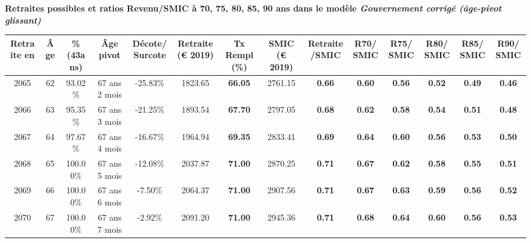  \vspace{0.1cm} 
{\bf \noindent Retraites possibles et ratios Revenu/SMIC à 70, 75, 80, 85, 90 ans dans le modèle \emph{Gouvernement corrigé (âge-pivot glissant)}}  
 
\begin{adjustbox}{max width=\textwidth} 
\begin{tabular}[htb]{|c|c||c|c|c||c|c||c|c||c|c|c|c|c|} 
\hline 
 Retraite en &  Âge &  \%(43ans) &  Âge pivot &  Décote/Surcote &  Retraite (\euro{} 2019) &  Tx Rempl(\%) &  SMIC (\euro{} 2019) &  Retraite/SMIC &  R70/SMIC &  R75/SMIC &  R80/SMIC &  R85/SMIC &  R90/SMIC \\ 
\hline \hline 
 2065 &  62 &  93.02\% &  67 ans 2 mois &  -25.83\% &  1823.65 &  {\bf 66.05} &  2761.15 &  {\bf {\color{red} 0.66}} &  {\bf {\color{red} 0.60}} &  {\bf {\color{red} 0.56}} &  {\bf {\color{red} 0.52}} &  {\bf {\color{red} 0.49}} &  {\bf {\color{red} 0.46}} \\ 
\hline 
 2066 &  63 &  95.35\% &  67 ans 3 mois &  -21.25\% &  1893.54 &  {\bf 67.70} &  2797.05 &  {\bf {\color{red} 0.68}} &  {\bf {\color{red} 0.62}} &  {\bf {\color{red} 0.58}} &  {\bf {\color{red} 0.54}} &  {\bf {\color{red} 0.51}} &  {\bf {\color{red} 0.48}} \\ 
\hline 
 2067 &  64 &  97.67\% &  67 ans 4 mois &  -16.67\% &  1964.94 &  {\bf 69.35} &  2833.41 &  {\bf {\color{red} 0.69}} &  {\bf {\color{red} 0.64}} &  {\bf {\color{red} 0.60}} &  {\bf {\color{red} 0.56}} &  {\bf {\color{red} 0.53}} &  {\bf {\color{red} 0.50}} \\ 
\hline 
 2068 &  65 &  100.00\% &  67 ans 5 mois &  -12.08\% &  2037.87 &  {\bf 71.00} &  2870.25 &  {\bf {\color{red} 0.71}} &  {\bf {\color{red} 0.67}} &  {\bf {\color{red} 0.62}} &  {\bf {\color{red} 0.58}} &  {\bf {\color{red} 0.55}} &  {\bf {\color{red} 0.51}} \\ 
\hline 
 2069 &  66 &  100.00\% &  67 ans 6 mois &  -7.50\% &  2064.37 &  {\bf 71.00} &  2907.56 &  {\bf {\color{red} 0.71}} &  {\bf {\color{red} 0.67}} &  {\bf {\color{red} 0.63}} &  {\bf {\color{red} 0.59}} &  {\bf {\color{red} 0.56}} &  {\bf {\color{red} 0.52}} \\ 
\hline 
 2070 &  67 &  100.00\% &  67 ans 7 mois &  -2.92\% &  2091.20 &  {\bf 71.00} &  2945.36 &  {\bf {\color{red} 0.71}} &  {\bf {\color{red} 0.68}} &  {\bf {\color{red} 0.64}} &  {\bf {\color{red} 0.60}} &  {\bf {\color{red} 0.56}} &  {\bf {\color{red} 0.53}} \\ 
\hline 
\hline 
\end{tabular} 
\end{adjustbox} 
 
